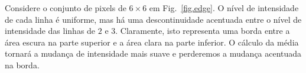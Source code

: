 
Considere o conjunto de pixels de $6\times 6$ em Fig.~\ref{fig.edge}. O nível de intensidade de cada linha é uniforme, mas há uma descontinuidade acentuada entre o nível de intensidade das linhas de $2$ e $3$. Claramente, isto representa uma borda entre a área escura na parte superior e a área clara na parte inferior. O cálculo da média tornará a mudança de intensidade mais suave e perderemos a mudança acentuada na borda.

